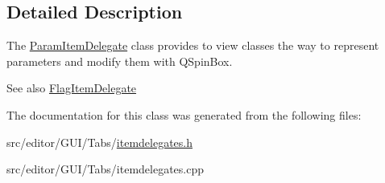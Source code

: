 \subsection{\-Detailed \-Description}
\-The \hyperlink{class_param_item_delegate}{\-Param\-Item\-Delegate} class provides to view classes the way to represent parameters and modify them with \-Q\-Spin\-Box. 

\begin{DoxySeeAlso}{\-See also}
\hyperlink{class_flag_item_delegate}{\-Flag\-Item\-Delegate} 
\end{DoxySeeAlso}


\-The documentation for this class was generated from the following files\-:\begin{DoxyCompactItemize}
\item 
src/editor/\-G\-U\-I/\-Tabs/\hyperlink{itemdelegates_8h}{itemdelegates.\-h}\item 
src/editor/\-G\-U\-I/\-Tabs/itemdelegates.\-cpp\end{DoxyCompactItemize}
